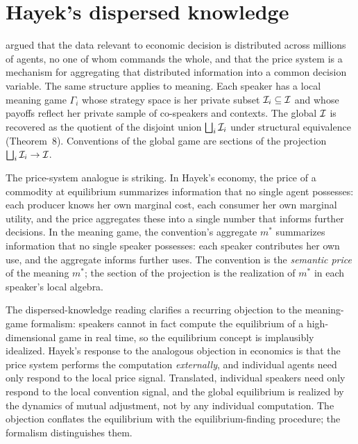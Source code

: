 \section{Hayek's dispersed knowledge}\label{sec:hayek}

\cite{Hayek1945} argued that the data relevant to economic decision is
distributed across millions of agents, no one of whom commands the
whole, and that the price system is a mechanism for aggregating that
distributed information into a common decision variable. The same
structure applies to meaning. Each speaker has a local meaning game
$\Gamma_i$ whose strategy space is her private subset
$\mathcal{I}_i\subseteq\mathcal{I}$ and whose payoffs reflect her private
sample of co-speakers and contexts. The global $\mathcal{I}$ is recovered
as the quotient of the disjoint union $\bigsqcup_i \mathcal{I}_i$ under
structural equivalence (Theorem~8). Conventions of the global game
are sections of the projection $\bigsqcup_i\mathcal{I}_i\to\mathcal{I}$.

The price-system analogue is striking. In Hayek's economy, the price
of a commodity at equilibrium summarizes information that no single
agent possesses: each producer knows her own marginal cost, each
consumer her own marginal utility, and the price aggregates these
into a single number that informs further decisions. In the meaning
game, the convention's aggregate $m^\ast$ summarizes information that
no single speaker possesses: each speaker contributes her own use,
and the aggregate informs further uses. The convention is the
\emph{semantic price} of the meaning $m^\ast$; the section of the
projection is the realization of $m^\ast$ in each speaker's local
algebra.

The dispersed-knowledge reading clarifies a recurring objection to
the meaning-game formalism: speakers cannot in fact compute the
equilibrium of a high-dimensional game in real time, so the
equilibrium concept is implausibly idealized. Hayek's response to the
analogous objection in economics is that the price system performs the
computation \emph{externally}, and individual agents need only respond
to the local price signal. Translated, individual speakers need only
respond to the local convention signal, and the global equilibrium is
realized by the dynamics of mutual adjustment, not by any individual
computation. The objection conflates the equilibrium with the
equilibrium-finding procedure; the formalism distinguishes them.

